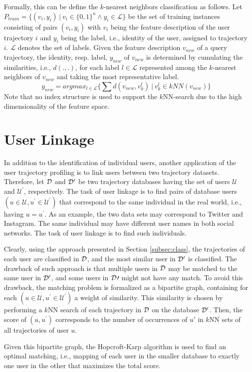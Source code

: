 Formally, this can be define the $k$-nearest neighbors classification as follows.
Let $P_{train} = \lbrace (v_i, y_i)~\vert~v_i \in \lbrace 0, 1\rbrace ^n \wedge y_i \in \mathcal{L} \rbrace$ be the set of training instances consisting of pairs $(v_i, y_i)$ with $v_i$ being the feature description of the user trajectory $i$ and $y_i$ being the label, i.e., identity of the user, assigned to trajectory $i$. $\mathcal{L}$ denotes the set of labels.
Given the feature description $v_{new}$ of a query trajectory, the identity, resp. label, $y_{new}$ of $v_{new}$ is determined by cumulating the similarities, i.e., $d(.,.)$, for each label $l \in \mathcal{L}$ represented among the $k$-nearest neighbors of $v_{new}$ and taking the most representative label.
$$y_{new} = argmax_{l \in \mathcal{L}} \lbrace \sum{d(v_{new}, v_k^l)}~\vert~v_k^l \in kNN(v_{new}) \rbrace$$
Note that no index structure is used to support the $k$NN-search due to the high dimensionality of the feature space.

\section{User Linkage}\label{subsec:linkage}
In addition to the identification of individual users, another application of the user trajectory profiling is to link users between two trajectory datasets. Therefore, let $\mathcal{D}$ and $\mathcal{D}^\prime$ be two trajectory databases having the set of users $\mathcal{U}$ and $\mathcal{U}^\prime$, respectively. The task of user linkage is to find pairs of database users $(u\in\mathcal{U},u^\prime\in\mathcal{U}^\prime)$ that correspond to the same individual in the real world, i.e., having $u=u^\prime$. As an example, the two data sets may correspond to Twitter and Instagram. The same individual may have different user names in both social networks. The task of user linkage is to find such individuals.

Clearly, using the approach presented in Section \ref{subsec:class}, the trajectories of each user are classified in $\mathcal{D}$, and the most similar user in $\mathcal{D}^\prime$ is classified. The drawback of such approach is that multiple users in $\mathcal{D}$ may be matched to the same user in $\mathcal{D}^\prime$, and some users in $\mathcal{D}\prime$ might not have any match. To avoid this drawback, the matching problem is formalized as a bipartite graph, containing for each $(u\in\mathcal{U},u^\prime\in\mathcal{U}^\prime)$ a weight of similarity. This similarity is chosen by performing a $k$NN search of each trajectory in $\mathcal{D}$ on the database $\mathcal{D}^\prime$. Then, the score of $(u,u^\prime)$ corresponds to the number of occurrences of $u\prime$ in $k$NN sets of all trajectories of user $u$.

Given this bipartite graph, the Hopcroft-Karp algorithm \cite{Hopcroft1973} is used to find an optimal matching, i.e., mapping of each user in the smaller database to exactly one user in the other that maximizes the total score.
